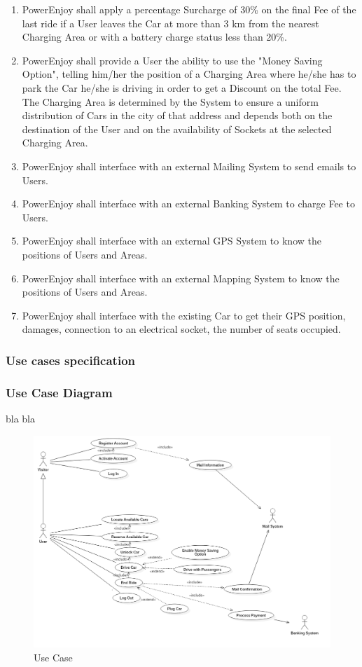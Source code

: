 \begin{enumerate}[label=R\arabic*]
\item PowerEnjoy shall apply a percentage Surcharge of 30\% on the final Fee of the last ride if a User leaves the Car at more than 3 km from the nearest Charging Area or with a battery charge status less than 20\%.
\item PowerEnjoy shall provide a User the ability to use the "Money Saving Option", telling him/her the position of a Charging Area where he/she has to park the Car he/she is driving in order to get a Discount on the total Fee. The Charging Area is determined by the System to ensure a uniform distribution of Cars in the city of that address and depends both on the destination of the User and on the availability of Sockets at the selected Charging Area.
\item PowerEnjoy shall interface with an external Mailing System to send emails to Users.
\item PowerEnjoy shall interface with an external Banking System to charge Fee to Users.
\item PowerEnjoy shall interface with an external GPS System to know the positions of Users and Areas.
\item PowerEnjoy shall interface with an external Mapping System to know the positions of Users and Areas.
\item PowerEnjoy shall interface with the existing Car to get their GPS position, damages, connection to an electrical socket, the number of seats occupied. 
\end{enumerate}

\subsubsection{Use cases specification}

\subsubsection{Use Case Diagram}
bla bla
\begin{figure}[p]
\centering
\includegraphics[width=\linewidth,keepaspectratio]{../Diagrams/UC/Use_Case.png}
\caption{Use Case}
\end{figure}
\FloatBarrier

